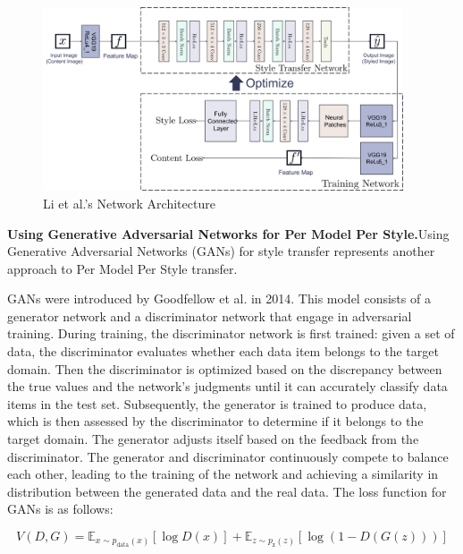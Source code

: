 \begin{figure}[!htbp]%
    \centering%
    \includegraphics[width=0.95\textwidth]{fig/Figure_5_Li_et_al_'s_Network_Architecture_[35].pdf}
    \caption{Li et al.'s Network Architecture\citep{35li2016precomputed}}\label{fig6_Ulyanov}
\end{figure}

\textbf{Using Generative Adversarial Networks for Per Model Per Style.}\quad Using Generative Adversarial Networks (GANs) for style transfer represents another approach to Per Model Per Style transfer.

GANs were introduced by Goodfellow et al. in 2014\citep{36goodfellow2020generative}. This model consists of a generator network and a discriminator network that engage in adversarial training. During training, the discriminator network is first trained: given a set of data, the discriminator evaluates whether each data item belongs to the target domain. Then the discriminator is optimized based on the discrepancy between the true values and the network's judgments until it can accurately classify data items in the test set. Subsequently, the generator is trained to produce data, which is then assessed by the discriminator to determine if it belongs to the target domain. The generator adjusts itself based on the feedback from the discriminator. The generator and discriminator continuously compete to balance each other, leading to the training of the network and achieving a similarity in distribution between the generated data and the real data. The loss function for GANs is as follows:

\begin{equation}
    \label{GAN_loss}
    V(D,G)=\mathbb{E}_{x\sim p_{\text{data}}(x)}\left[\log D(x)\right]+\mathbb{E}_{z\sim p_{\text{z}}(z)}\left[\log \left(1-D(G(z))\right)\right]
\end{equation}

